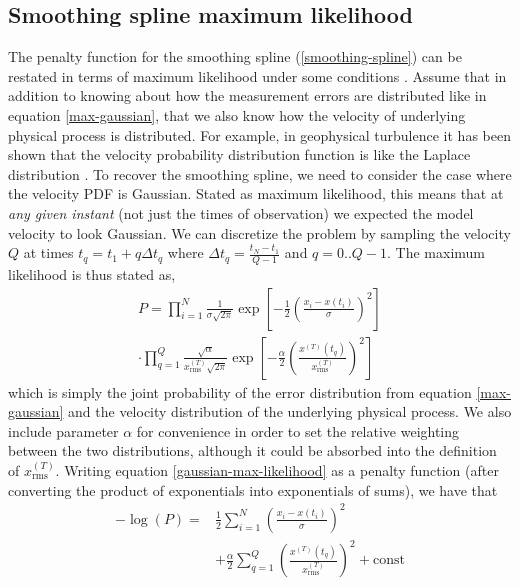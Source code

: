 \documentclass[10pt,journal]{IEEEtran}
\begin{document}
\subsection{Smoothing spline maximum likelihood}
\label{sec:maximum_likelihood}

The penalty function for the smoothing spline (\ref{smoothing-spline}) can be restated in terms of maximum likelihood under some conditions \cite{}. Assume that in addition to knowing about how the measurement errors are distributed like in equation \ref{max-gaussian}, that we also know how the velocity of underlying physical process is distributed. For example, in geophysical turbulence it has been shown that the velocity probability distribution function is like the Laplace distribution \cite{bracco2000-pf}. To recover the smoothing spline, we need to consider the case where the velocity PDF is Gaussian. Stated as maximum likelihood, this means that at \emph{any given instant} (not just the times of observation) we expected the model velocity to look Gaussian. We can discretize the problem by sampling the velocity $Q$ at times $t_q = t_1 + q \Delta t_q$ where $\Delta t_q=\frac{t_N-t_1}{Q-1}$ and $q=0..Q-1$. The maximum likelihood is thus stated as,
\begin{equation}
\label{gaussian-max-likelihood}
\begin{split}
P =   \prod^N _{i=1}\frac{1}{\sigma \sqrt{2 \pi}}\exp \left[ -\frac{1}{2} \left( \frac{x_i - x(t_i)}{\sigma} \right)^2 \right] \\ \nonumber \cdot  \prod^{Q}_{q=1}\frac{\sqrt{\alpha}}{x^{(T)}_{\textrm{rms}} \sqrt{2 \pi}} \exp \left[  - \frac{\alpha}{2} \left(  \frac{x^{(T)}(t_q)}{x^{(T)}_{\textrm{rms}}} \right)^2 \right]
\end{split}
\end{equation}
which is simply the joint probability of the error distribution from equation \ref{max-gaussian} and the velocity distribution of the underlying physical process. We also include parameter $\alpha$ for convenience in order to set the relative weighting between the two distributions, although it could be absorbed into the definition of $x^{(T)}_{\textrm{rms}}$. Writing equation \ref{gaussian-max-likelihood} as a penalty function (after converting the product of exponentials into exponentials of sums), we have that
\begin{align}
\label{smoothing-spline-log-likelihood}
-\log(P)=& \frac{1}{2}\sum^N _{i=1}  \left( \frac{x_i - x(t_i)}{\sigma} \right)^2 \\ &+ \frac{\alpha}{2} \sum^{Q}_{q=1} \left( \frac{x^{(T)}(t_q)}{x^{(T)}_{\textrm{rms}}} \right)^2 + \textrm{const}
\end{align}
\end{document}

